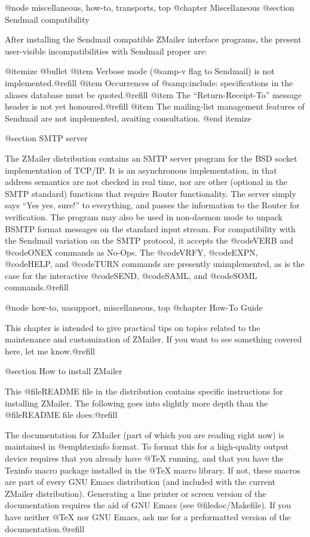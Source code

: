 {{@node miscellaneous, how-to, transports, top
@chapter Miscellaneous
@section Sendmail compatibility

After installing the Sendmail compatible ZMailer interface programs, the
present user-visible incompatibilities with Sendmail proper are:

@itemize @bullet
@item
Verbose mode (@samp{-v} flag to Sendmail) is not implemented.@refill
@item
Occurrences of @samp{:include:} specifications in the aliases database
must be quoted.@refill
@item
The ``Return-Receipt-To'' message header is not yet honoured.@refill
@item
The mailing-list management features of Sendmail are not implemented,
avaiting consultation.
@end itemize

@section SMTP server

The ZMailer distribution contains an SMTP server program for the BSD socket
implementation of TCP/IP.  It is an asynchronous implementation, in that
address semantics are not checked in real time, nor are other (optional in
the SMTP standard) functions that require Router functionality.  The server
simply says ``Yes yes, sure!'' to everything, and passes the information to
the Router for verification.  The program may also be used in non-daemon
mode to unpack BSMTP format messages on the standard input stream.  For
compatibility with the Sendmail variation on the SMTP protocol, it accepts
the @code{VERB} and @code{ONEX} commands as No-Ops.  The @code{VRFY},
@code{EXPN}, @code{HELP}, and @code{TURN} commands are presently
unimplemented, as is the case for the interactive @code{SEND}, @code{SAML},
and @code{SOML} commands.@refill

@node how-to, uasupport, miscellaneous, top
@chapter How-To Guide

This chapter is intended to give practical tips on topics related to the
maintenance and customization of ZMailer.  If you want to see something
covered here, let me know.@refill

@section How to install ZMailer

Thie @file{README} file in the distribution contains specific instructions
for installing ZMailer.  The following goes into slightly more depth than the
@file{README} file does:@refill

The documentation for ZMailer (part of which you are reading right now) is
maintained in @emph{texinfo} format.  To format this for a high-quality output
device requires that you already have @TeX{} running, and that you have the
Texinfo macro package installed in the @TeX{} macro library.  If not, these
macros are part of every GNU Emacs distribution (and included with the
current ZMailer distribution).  Generating a line printer or screen version
of the documentation requires the aid of GNU Emacs (see @file{doc/Makefile}).
If you have neither @TeX{} nor GNU Emacs, ask me for a preformatted version
of the documentation.@refill

}}
